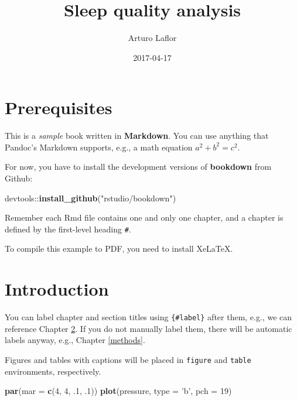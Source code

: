 \documentclass[]{book}
\title{Sleep quality analysis}
\author{Arturo Laflor}
\date{2017-04-17}
\newenvironment{Shaded}{\begin{snugshade}}{\end{snugshade}}
\newcommand{\KeywordTok}[1]{\textcolor[rgb]{0.13,0.29,0.53}{\textbf{{#1}}}}
\newcommand{\DataTypeTok}[1]{\textcolor[rgb]{0.13,0.29,0.53}{{#1}}}
\newcommand{\DecValTok}[1]{\textcolor[rgb]{0.00,0.00,0.81}{{#1}}}
\newcommand{\StringTok}[1]{\textcolor[rgb]{0.31,0.60,0.02}{{#1}}}
\newcommand{\NormalTok}[1]{{#1}}
\begin{document}
\maketitle

{
\setcounter{tocdepth}{1}
\tableofcontents
}
\chapter{Prerequisites}\label{prerequisites}

This is a \emph{sample} book written in \textbf{Markdown}. You can use
anything that Pandoc's Markdown supports, e.g., a math equation
\(a^2 + b^2 = c^2\).

For now, you have to install the development versions of
\textbf{bookdown} from Github:

\begin{Shaded}
\begin{Highlighting}[]
\NormalTok{devtools::}\KeywordTok{install_github}\NormalTok{(}\StringTok{"rstudio/bookdown"}\NormalTok{)}
\end{Highlighting}
\end{Shaded}

Remember each Rmd file contains one and only one chapter, and a chapter
is defined by the first-level heading \texttt{\#}.

To compile this example to PDF, you need to install XeLaTeX.

\chapter{Introduction}\label{intro}

You can label chapter and section titles using \texttt{\{\#label\}}
after them, e.g., we can reference Chapter \ref{intro}. If you do not
manually label them, there will be automatic labels anyway, e.g.,
Chapter \ref{methods}.

Figures and tables with captions will be placed in \texttt{figure} and
\texttt{table} environments, respectively.

\begin{Shaded}
\begin{Highlighting}[]
\KeywordTok{par}\NormalTok{(}\DataTypeTok{mar =} \KeywordTok{c}\NormalTok{(}\DecValTok{4}\NormalTok{, }\DecValTok{4}\NormalTok{, .}\DecValTok{1}\NormalTok{, .}\DecValTok{1}\NormalTok{))}
\KeywordTok{plot}\NormalTok{(pressure, }\DataTypeTok{type =} \StringTok{'b'}\NormalTok{, }\DataTypeTok{pch =} \DecValTok{19}\NormalTok{)}
\end{Highlighting}
\end{Shaded}
\end{document}
